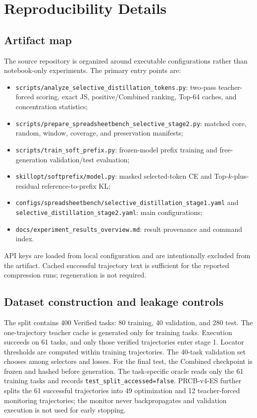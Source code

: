 \section{Reproducibility Details}
\label{app:repro}

\subsection{Artifact map}
The source repository is organized around executable configurations rather than notebook-only experiments.  The primary entry points are:
\begin{itemize}
    \item \texttt{scripts/analyze\_selective\_distillation\_tokens.py}: two-pass teacher-forced scoring, exact JS, positive/Combined ranking, Top-64 caches, and concentration statistics;
    \item \texttt{scripts/prepare\_spreadsheetbench\_selective\_stage2.py}: matched core, random, window, coverage, and preservation manifests;
    \item \texttt{scripts/train\_soft\_prefix.py}: frozen-model prefix training and free-generation validation/test evaluation;
    \item \texttt{skillopt/softprefix/model.py}: masked selected-token CE and Top-$k$-plus-residual reference-to-prefix KL;
    \item \texttt{configs/spreadsheetbench/selective\_distillation\_stage1.yaml} and \texttt{selective\_distillation\_stage2.yaml}: main configurations;
    \item \texttt{docs/experiment\_results\_overview.md}: result provenance and command index.
\end{itemize}
API keys are loaded from local configuration and are intentionally excluded from the artifact.  Cached successful trajectory text is sufficient for the reported compression runs; regeneration is not required.

\subsection{Dataset construction and leakage controls}
The split contains 400 Verified tasks: 80 training, 40 validation, and 280 test.  The one-trajectory teacher cache is generated only for training tasks.  Execution succeeds on 61 tasks, and only those verified trajectories enter stage 1.  Locator thresholds are computed within training trajectories.  The 40-task validation set chooses among selectors and losses.  For the final test, the Combined checkpoint is frozen and hashed before generation.  The task-specific oracle reads only the 61 training tasks and records \texttt{test\_split\_accessed=false}.  PRCB-v4-ES further splits the 61 successful trajectories into 49 optimization and 12 teacher-forced monitoring trajectories; the monitor never backpropagates and validation execution is not used for early stopping.

